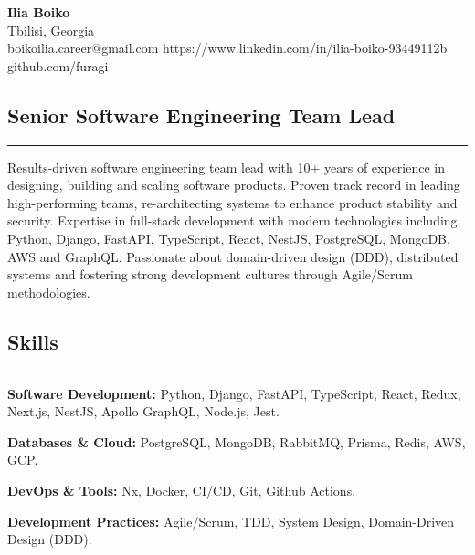 \documentclass[11pt,letterpaper]{article}
\begin{document}
\begin{center}
	{\LARGE \textbf{Ilia Boiko}}\\
	Tbilisi, Georgia
	\vspace{0.05cm}
	\\
	\raisebox{-0.2\height}{\Large \faEnvelopeSquare} boikoilia.career@gmail.com \hfill \raisebox{-0.2\height}{\Large \faLinkedin} https://www.linkedin.com/in/ilia-boiko-93449112b \hfill \raisebox{-0.2\height}{\Large \faGithubSquare} github.com/furagi \hfill 
\end{center}

\subsection*{\Large Senior Software Engineering Team Lead}
\vspace{-.5em}
\hrule
\vspace{1em}
Results-driven software engineering team lead with 10+ years of experience in designing, building and scaling software products. Proven track record in leading high-performing teams, re-architecting systems to enhance product stability and security. Expertise in full-stack development with modern technologies including Python, Django, FastAPI, TypeScript, React, NestJS, PostgreSQL, MongoDB, AWS and GraphQL. Passionate about domain-driven design (DDD), distributed systems and fostering strong development cultures through Agile/Scrum methodologies.

\subsection*{\Large Skills}
\vspace{-.5em}
\hrule
\vspace{1em}
\begin{itemize*}
	\item {\textbf{Software Development:}} Python, Django, FastAPI, TypeScript, React, Redux, Next.js, NestJS, Apollo GraphQL,  Node.js, Jest.
	\item {\textbf{Databases \& Cloud:}} PostgreSQL, MongoDB, RabbitMQ, Prisma, Redis, AWS, GCP.
	\item {\textbf{DevOps \& Tools:}} Nx, Docker, CI/CD, Git, Github Actions.
	\item {\textbf{Development Practices:}} Agile/Scrum, TDD, System Design, Domain-Driven Design (DDD).
\end{itemize*}
\end{document}
